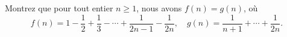 Montrez que pour tout entier $n \geq 1$, nous avons $f(n) = g(n)$, où
\[
f(n) = 1 - \frac{1}{2} + \frac{1}{3} - \cdots + \frac{1}{2n-1} - \frac{1}{2n},
\quad
g(n) = \frac{1}{n+1} + \cdots + \frac{1}{2n}.
\]
